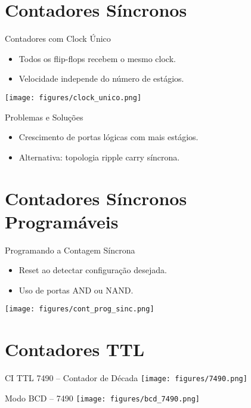 \documentclass{beamer}
\begin{document}
\section{Contadores Síncronos}

\begin{frame}{Contadores com Clock Único}
\begin{itemize}
  \item Todos os flip-flops recebem o mesmo clock.
  \item Velocidade independe do número de estágios.
\end{itemize}
\centering
\texttt{[image: figures/clock\_unico.png]}
\end{frame}

\begin{frame}{Problemas e Soluções}
\begin{itemize}
  \item Crescimento de portas lógicas com mais estágios.
  \item Alternativa: topologia ripple carry síncrona.
\end{itemize}
\end{frame}

\section{Contadores Síncronos Programáveis}

\begin{frame}{Programando a Contagem Síncrona}
\begin{itemize}
  \item Reset ao detectar configuração desejada.
  \item Uso de portas AND ou NAND.
\end{itemize}
\centering
\texttt{[image: figures/cont\_prog\_sinc.png]}
\end{frame}

\section{Contadores TTL}

\begin{frame}{CI TTL 7490 – Contador de Década}
\centering
\texttt{[image: figures/7490.png]}
\end{frame}

\begin{frame}{Modo BCD – 7490}
\centering
\texttt{[image: figures/bcd\_7490.png]}
\end{frame}
\end{document}
